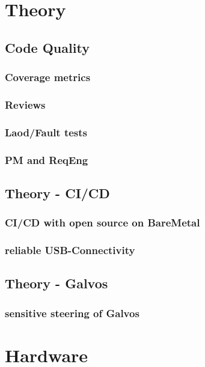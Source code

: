 \chapter{Theory}
\label{cha:Theory}
	\section{Code Quality}
	\subsection{Coverage metrics}
	\subsection{Reviews}
	\subsection{Laod/Fault tests}
	\subsection{PM and ReqEng}

	\section{Theory - CI/CD}
	\subsection{CI/CD with open source on BareMetal}
	\subsection{reliable USB-Connectivity}
	\section{Theory - Galvos}
	\subsection{sensitive steering of Galvos}
	
\chapter{Hardware}
\label{cha:Hardware}
